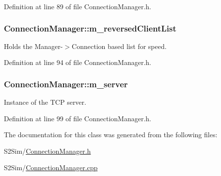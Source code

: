 Definition at line 89 of file Connection\-Manager.\-h.

\hypertarget{class_connection_manager_aae27a14334d4b84076231534196e75eb}{
\subsubsection[{m\-\_\-reversed\-Client\-List}]{ Connection\-Manager\-::m\-\_\-reversed\-Client\-List\hspace{0.3cm}{\ttfamily [private]}}}\label{class_connection_manager_aae27a14334d4b84076231534196e75eb}
Holds the Manager-\/$>$Connection based list for speed. 

Definition at line 94 of file Connection\-Manager.\-h.

\hypertarget{class_connection_manager_a8858415ddb04364d4697f7ea00aa2977}{
\subsubsection[{m\-\_\-server}]{ Connection\-Manager\-::m\-\_\-server\hspace{0.3cm}{\ttfamily [private]}}}\label{class_connection_manager_a8858415ddb04364d4697f7ea00aa2977}
Instance of the T\-C\-P server. 

Definition at line 99 of file Connection\-Manager.\-h.



The documentation for this class was generated from the following files\-:\begin{DoxyCompactItemize}
\item 
S2\-Sim/\hyperlink{_connection_manager_8h}{Connection\-Manager.\-h}\item 
S2\-Sim/\hyperlink{_connection_manager_8cpp}{Connection\-Manager.\-cpp}\end{DoxyCompactItemize}
